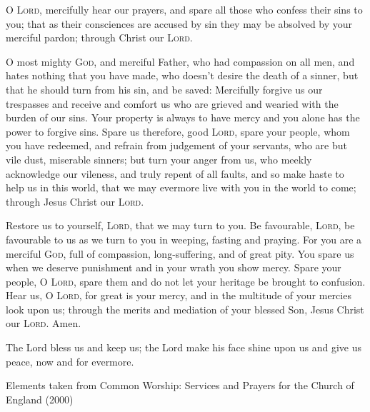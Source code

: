 \documentclass{liturgy}
\begin{document}
\begin{leader}
  O \textsc{Lord}, mercifully hear our prayers, and spare all those who confess their sins to you; that as their consciences are accused by sin they may be absolved by your merciful pardon; through Christ our \textsc{Lord}. 

  O most mighty \textsc{God}, and merciful Father, who had compassion on all men, and hates nothing that you have made, who doesn't desire the death of a sinner, but that he should turn from his sin, and be saved: Mercifully forgive us our trespasses and receive and comfort us who are grieved and wearied with the burden of our sins. Your property is always to have mercy and you alone has the power to forgive sins. Spare us therefore, good \textsc{Lord}, spare your people, whom you have redeemed, and refrain from judgement of your servants, who are but vile dust, miserable sinners; but turn your anger from us, who meekly acknowledge our vileness, and truly repent of all faults, and so make haste to help us in this world, that we may evermore live with you in the world to come; through Jesus Christ our \textsc{Lord}. 
\end{leader}
\begin{all}
  Restore us to yourself, \textsc{Lord}, that we may turn to you. Be favourable, \textsc{Lord}, be favourable to us as we turn to you in weeping, fasting and praying. For you are a merciful \textsc{God}, full of compassion, long-suffering, and of great pity. You spare us when we deserve punishment and in your wrath you show mercy. Spare your people, O \textsc{Lord}, spare them and do not let your heritage be brought to confusion. Hear us, O \textsc{Lord}, for great is your mercy, and in the multitude of your mercies look upon us; through the merits and mediation of your blessed Son, Jesus Christ our \textsc{Lord}. Amen.
\end{all}
\begin{leader}
  The Lord bless us and keep us; the Lord make his face shine upon us and give us peace, now and for evermore. 
\end{leader}

\vfill

{
  \tiny\noindent
  Elements taken from Common Worship: Services and Prayers for the Church of England (2000)
}
\end{document}
